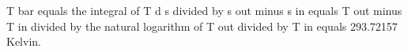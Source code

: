 T bar equals the integral of T d s divided by s out minus s in equals T out minus T in divided by the natural logarithm of T out divided by T in equals 293.72157 Kelvin.